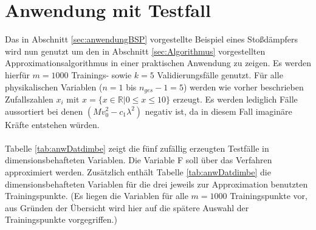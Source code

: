 \section{Anwendung mit Testfall}
\label{sec:Anwendung Testfall}
Das in Abschnitt \ref{sec:anwendungBSP} vorgestellte Beispiel eines Stoßdämpfers wird nun genutzt um den in Abschnitt \ref{sec:Algorithmus} vorgestellten Approximationsalgorithmus in einer praktischen Anwendung zu zeigen. Es werden hierfür $m = 1000$ Trainings- sowie $k = 5$ Validierungsfälle genutzt. Für alle physikalischen Variablen ($n = 1$ bis $n_{ges}-1 = 5$) werden wie vorher beschrieben Zufallszahlen $x_i$ mit $x=\{x \in \mathbb{R} | 0 \le x \leq 10\} $ erzeugt. Es werden lediglich Fälle aussortiert bei denen $(M v_0^2 - c_1 \lambda^2)$ negativ ist, da in diesem Fall imaginäre Kräfte entstehen würden.\\
\parskip 12pt \\
Tabelle \ref{tab:anwDatdimbe} zeigt die fünf zufällig erzeugten Testfälle in dimensionsbehafteten Variablen. Die Variable F soll über das Verfahren approximiert werden. Zusätzlich enthält Tabelle \ref{tab:anwDatdimbe} die dimensionsbehafteten Variablen für die drei jeweils zur Approximation benutzten Trainingspunkte. (Es liegen die Variablen für alle $m = 1000$ Trainingspunkte vor, aus Gründen der Übersicht wird hier auf die spätere Auswahl der Trainingspunkte vorgegriffen.)


